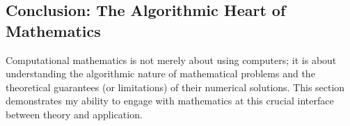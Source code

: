 \documentclass[11pt, a4paper]{article}
\theoremstyle{plain} %
\theoremstyle{definition} %
\theoremstyle{remark} %
\begin{document}
\subsection{Conclusion: The Algorithmic Heart of Mathematics}
Computational mathematics is not merely about using computers; it is about understanding the algorithmic nature of mathematical problems and the theoretical guarantees (or limitations) of their numerical solutions. This section demonstrates my ability to engage with mathematics at this crucial interface between theory and application.
\end{document}

